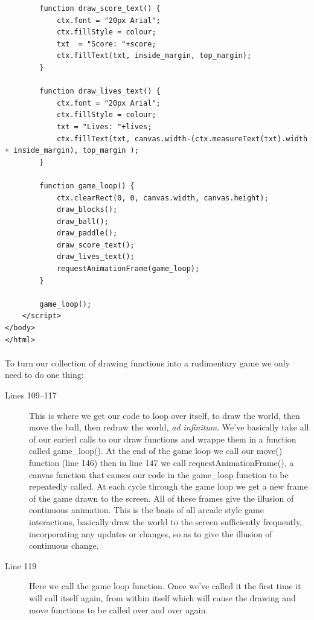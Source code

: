 \documentclass[10pt, a4paper, oneside]{article}
\begin{document}
\begin{lstlisting}
        function draw_score_text() {
            ctx.font = "20px Arial";
            ctx.fillStyle = colour;
            txt  = "Score: "+score;
            ctx.fillText(txt, inside_margin, top_margin);
        }

        function draw_lives_text() {
            ctx.font = "20px Arial";
            ctx.fillStyle = colour;
            txt = "Lives: "+lives;
            ctx.fillText(txt, canvas.width-(ctx.measureText(txt).width + inside_margin), top_margin );
        }

        function game_loop() {
            ctx.clearRect(0, 0, canvas.width, canvas.height);
            draw_blocks();
            draw_ball();
            draw_paddle();
            draw_score_text();
            draw_lives_text();
            requestAnimationFrame(game_loop);
        }
        
        game_loop();
    </script>
</body>
</html>
\end{lstlisting}

\paragraph{} To turn our collection of drawing functions into a rudimentary game we only need to do one thing:

\begin{description}
\item[Lines 109--117] This is where we get our code to loop over itself, to draw the world, then move the ball, then redraw the world, \emph{ad infinitum}. We've basically take all of our earierl calls to our draw functions and wrappe them in a function called game\_loop(). At the end of the game loop we call our move() function (line 146) then in line 147 we call requestAnimationFrame(), a canvas function that causes our code in the game\_loop function to be repeatedly called. At each cycle through the game loop we get a new frame of the game drawn to the screen. All of these frames give the illusion of continuous animation. This is the basis of all arcade style game interactions, basically draw the world to the screen sufficiently frequently, incorporating any updates or changes, so as to give the illusion of continuous change.
\item[Line 119] Here we call the game loop function. Once we've called it the first time it will call itself again, from within itself which will cause the drawing and move functions to be called over and over again.
\end{description}
\end{document}
